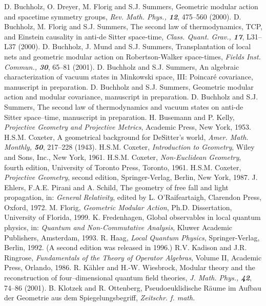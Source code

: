\documentclass[a4paper,twoside,12pt]{article}
\begin{document}
\begin{thebibliography}{Bor}
D. Buchholz, O. Dreyer, M. Florig and S.J. Summers, Geometric 
modular action and spacetime symmetry groups, {\sl Rev. Math. Phys., \bf 12}, 
475--560 (2000).
D. Buchholz, M. Florig and S.J. Summers, The second law of 
thermodynamics, TCP, and Einstein causality in anti-de Sitter space-time, 
{\sl Class. Quant. Grav., \bf 17}, L31--L37 (2000).
D. Buchholz, J. Mund and S.J. Summers, Transplantation of local 
nets and geometric modular action on Robertson-Walker space-times, {\sl Fields 
Inst. Commun., \bf 30}, 65--81 (2001).
D. Buchholz and S.J. Summers, An algebraic 
characterization of vacuum states in Minkowski space, III: Poincar\'e
covariance, manuscript in preparation.
D. Buchholz and S.J. Summers, Geometric modular action and 
modular covariance, manuscript in preparation.
D. Buchholz and S.J. Summers, The second law of 
thermodynamics and vacuum states on anti-de Sitter space--time, manuscript
in preparation.
H. Busemann and P. Kelly, {\it Projective Geometry and 
Projective Metrics}, Academic Press, New York, 1953.
H.S.M. Coxeter, A geometrical background for DeSitter's
world, {\sl Amer. Math. Monthly, \bf 50}, 217--228 (1943).
H.S.M. Coxeter, {\it Introduction to Geometry}, Wiley and
Sons, Inc., New York, 1961.
H.S.M. Coxeter, {\it Non-Euclidean Geometry}, fourth edition, 
University of Toronto Press, Toronto, 1961.
H.S.M. Coxeter, {\it Projective Geometry}, second edition,
Springer-Verlag, Berlin, New York, 1987.
J. Ehlers, F.A.E. Pirani and A. Schild, The geometry of
free fall and light propagation, in: {\it General Relativity}, edited
by L. O'Raifeartaigh, Clarendon Press, Oxford, 1972.
M. Florig, {\it Geometric Modular Action}, Ph.D. Dissertation, 
University of Florida, 1999.
K. Fredenhagen, Global observables in local quantum physics, in:
{\it Quantum and Non-Commutative Analysis}, Kluwer Academic Publishers, 
Amsterdam, 1993. 
R. Haag, {\it Local Quantum Physics}, Springer-Verlag, Berlin,  
1992. (A second edition was released in 1996.)
R.V. Kadison and J.R. Ringrose, {\it Fundamentals of the 
Theory of Operator Algebras}, Volume II, Academic Press, Orlando, 1986.
R. K\"ahler and H.-W. Wiesbrock, Modular theory and the 
reconstruction of four--dimensional quantum field theories, {\sl J. Math. 
Phys., \bf 42}, 74--86 (2001).
B. Klotzek and R. Ottenberg, Pseudoeuklidische R\"aume im 
Aufbau der Geometrie aus dem Spiegelungsbegriff, {\sl Zeitschr. f. math. 
}
\end{thebibliography}
\end{document}
